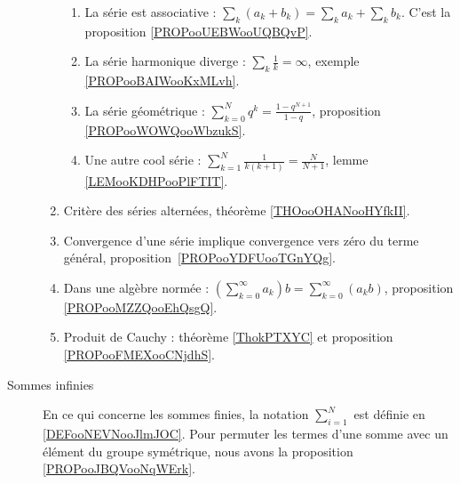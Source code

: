 \begin{description}
\begin{enumerate}
			      \begin{enumerate}
				      \item
				            La série est associative : \( \sum_k(a_k+b_k)=\sum_ka_k+\sum_kb_k\). C'est la proposition \ref{PROPooUEBWooUQBQvP}.
				      \item
				            La série harmonique diverge : \( \sum_k\frac{1}{ k }=\infty\), exemple \ref{PROPooBAIWooKxMLvh}.
				      \item
				            La série géométrique : \( \sum_{k=0}^Nq^k=\frac{ 1-q^{N+1} }{ 1-q }\), proposition \ref{PROPooWOWQooWbzukS}.
				      \item
				            Une autre cool série : \( \sum_{k=1}^N\frac{ 1 }{ k(k+1) }=\frac{ N }{ N+1 }\), lemme \ref{LEMooKDHPooPlFTIT}.
			      \end{enumerate}
			\item
			      Critère des séries alternées, théorème \ref{THOooOHANooHYfkII}.
			\item
			      Convergence d'une série implique convergence vers zéro du terme général, proposition~\ref{PROPooYDFUooTGnYQg}.
			\item
			      Dans une algèbre normée : \( (\sum_{k=0}^{\infty}a_k)b=\sum_{k=0}^{\infty}(a_kb)\), proposition \ref{PROPooMZZQooEhQsgQ}.
			\item
			      Produit de Cauchy : théorème \ref{ThokPTXYC} et proposition \ref{PROPooFMEXooCNjdhS}.
		\end{enumerate}

	\item[Sommes infinies]
		En ce qui concerne les sommes finies, la notation \( \sum_{i=1}^N\) est définie en \ref{DEFooNEVNooJlmJOC}. Pour permuter les termes d'une somme avec un élément du groupe symétrique, nous avons la proposition \ref{PROPooJBQVooNqWErk}.


\end{description}
